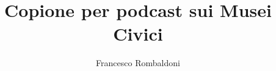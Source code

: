 \documentclass[hidelinks,12pt,a4paper]{article}
\begin{document}
	\begin{flushleft}
		
		\LARGE
		
		\title{\textbf{Copione per podcast sui Musei Civici}}
		\author{Francesco Rombaldoni}
		\date{}
		
		\maketitle
		
		\setcounter{page}{1}
		\newpage
		
		\tableofcontents
		\newpage
		
		
		\vspace*{\fill}
		\doclicenseThis
	\end{flushleft}
\end{document}
